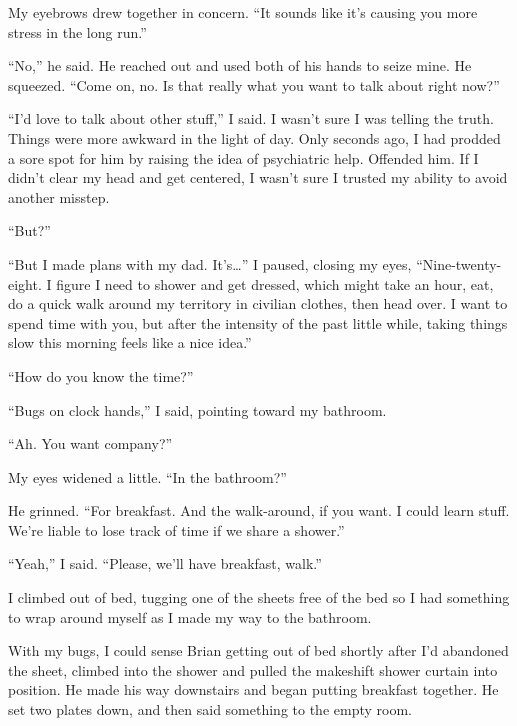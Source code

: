 My eyebrows drew together in concern.  ``It sounds like it's causing you more stress in the long run.''



``No,'' he said.  He reached out and used both of his hands to seize mine.  He squeezed.  ``Come on, no.  Is that really what you want to talk about right now?''



``I'd love to talk about other stuff,'' I said.  I wasn't sure I was telling the truth.  Things were more awkward in the light of day.  Only seconds ago, I had prodded a sore spot for him by raising the idea of psychiatric help.  Offended him.  If I didn't clear my head and get centered, I wasn't sure I trusted my ability to avoid another misstep.



``But?''



``But I made plans with my dad.  It's\ldots''  I paused, closing my eyes, ``Nine-twenty-eight.  I figure I need to shower and get dressed, which might take an hour, eat, do a quick walk around my territory in civilian clothes, then head over.  I want to spend time with you, but after the intensity of the past little while, taking things slow this morning feels like a nice idea.''



``How do you know the time?''



``Bugs on clock hands,'' I said, pointing toward my bathroom.



``Ah.  You want company?''



My eyes widened a little.  ``In the bathroom?''



He grinned.  ``For breakfast.  And the walk-around, if you want.  I could learn stuff.  We're liable to lose track of time if we share a shower.''



``Yeah,'' I said.  ``Please, we'll have breakfast, walk.''



I climbed out of bed, tugging one of the sheets free of the bed so I had something to wrap around myself as I made my way to the bathroom.



With my bugs, I could sense Brian getting out of bed shortly after I'd abandoned the sheet, climbed into the shower and pulled the makeshift shower curtain into position.  He made his way downstairs and began putting breakfast together.  He set two plates down, and then said something to the empty room.



